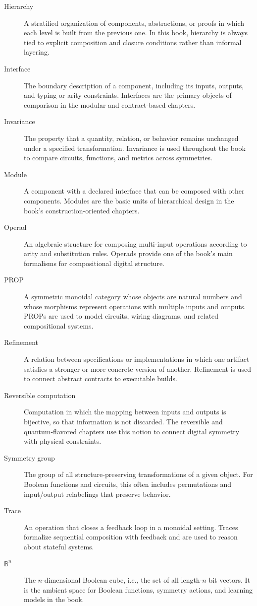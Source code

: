 \begin{description}
  \item[Hierarchy] A stratified organization of components, abstractions, or proofs in which each level is built from the previous one. In this book, hierarchy is always tied to explicit composition and closure conditions rather than informal layering.

  \item[Interface] The boundary description of a component, including its inputs, outputs, and typing or arity constraints. Interfaces are the primary objects of comparison in the modular and contract-based chapters.

  \item[Invariance] The property that a quantity, relation, or behavior remains unchanged under a specified transformation. Invariance is used throughout the book to compare circuits, functions, and metrics across symmetries.

  \item[Module] A component with a declared interface that can be composed with other components. Modules are the basic units of hierarchical design in the book's construction-oriented chapters.

  \item[Operad] An algebraic structure for composing multi-input operations according to arity and substitution rules. Operads provide one of the book's main formalisms for compositional digital structure.

  \item[PROP] A symmetric monoidal category whose objects are natural numbers and whose morphisms represent operations with multiple inputs and outputs. PROPs are used to model circuits, wiring diagrams, and related compositional systems.

  \item[Refinement] A relation between specifications or implementations in which one artifact satisfies a stronger or more concrete version of another. Refinement is used to connect abstract contracts to executable builds.

  \item[Reversible computation] Computation in which the mapping between inputs and outputs is bijective, so that information is not discarded. The reversible and quantum-flavored chapters use this notion to connect digital symmetry with physical constraints.

  \item[Symmetry group] The group of all structure-preserving transformations of a given object. For Boolean functions and circuits, this often includes permutations and input/output relabelings that preserve behavior.

  \item[Trace] An operation that closes a feedback loop in a monoidal setting. Traces formalize sequential composition with feedback and are used to reason about stateful systems.

  \item[\(\mathbb{B}^n\)] The \(n\)-dimensional Boolean cube, i.e., the set of all length-\(n\) bit vectors. It is the ambient space for Boolean functions, symmetry actions, and learning models in the book.
\end{description}

